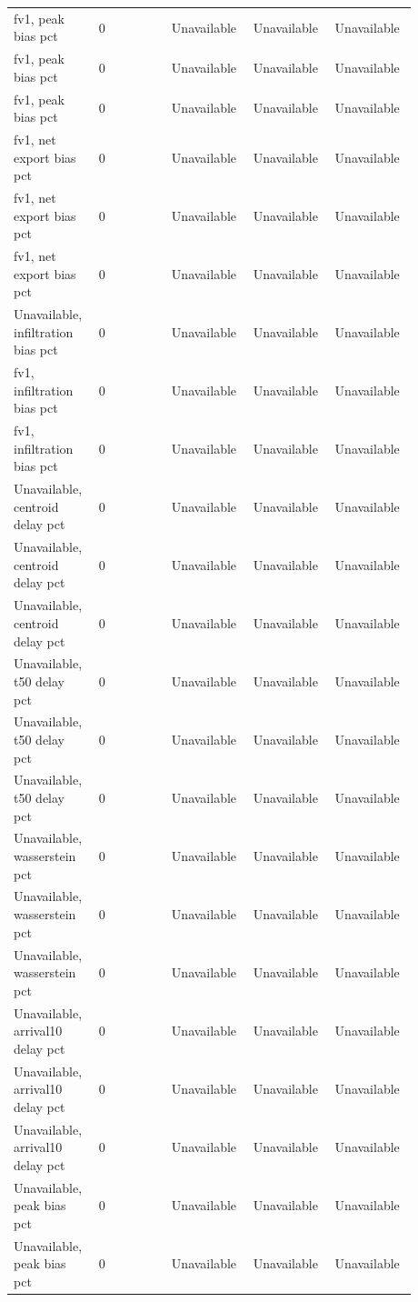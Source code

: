 \begin{longtable}{p{0.1760\linewidth}p{0.1760\linewidth}p{0.1760\linewidth}p{0.1760\linewidth}p{0.1760\linewidth}}
fv1, peak bias pct & 0 & Unavailable & Unavailable & Unavailable \\
fv1, peak bias pct & 0 & Unavailable & Unavailable & Unavailable \\
fv1, peak bias pct & 0 & Unavailable & Unavailable & Unavailable \\
fv1, net export bias pct & 0 & Unavailable & Unavailable & Unavailable \\
fv1, net export bias pct & 0 & Unavailable & Unavailable & Unavailable \\
fv1, net export bias pct & 0 & Unavailable & Unavailable & Unavailable \\
Unavailable, infiltration bias pct & 0 & Unavailable & Unavailable & Unavailable \\
fv1, infiltration bias pct & 0 & Unavailable & Unavailable & Unavailable \\
fv1, infiltration bias pct & 0 & Unavailable & Unavailable & Unavailable \\
Unavailable, centroid delay pct & 0 & Unavailable & Unavailable & Unavailable \\
Unavailable, centroid delay pct & 0 & Unavailable & Unavailable & Unavailable \\
Unavailable, centroid delay pct & 0 & Unavailable & Unavailable & Unavailable \\
Unavailable, t50 delay pct & 0 & Unavailable & Unavailable & Unavailable \\
Unavailable, t50 delay pct & 0 & Unavailable & Unavailable & Unavailable \\
Unavailable, t50 delay pct & 0 & Unavailable & Unavailable & Unavailable \\
Unavailable, wasserstein pct & 0 & Unavailable & Unavailable & Unavailable \\
Unavailable, wasserstein pct & 0 & Unavailable & Unavailable & Unavailable \\
Unavailable, wasserstein pct & 0 & Unavailable & Unavailable & Unavailable \\
Unavailable, arrival10 delay pct & 0 & Unavailable & Unavailable & Unavailable \\
Unavailable, arrival10 delay pct & 0 & Unavailable & Unavailable & Unavailable \\
Unavailable, arrival10 delay pct & 0 & Unavailable & Unavailable & Unavailable \\
Unavailable, peak bias pct & 0 & Unavailable & Unavailable & Unavailable \\
Unavailable, peak bias pct & 0 & Unavailable & Unavailable & Unavailable \\

\end{longtable}
